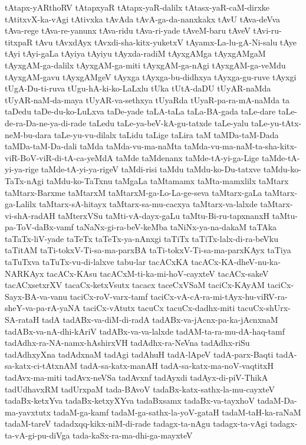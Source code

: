{tAtapx-yARthoRV
tAtapxyaR
tAtapx-yaR-dalilx
tAtasx-yaR-caM-dirxke
tAtitxvX-ka-vAgi
tAtivxka
tAvAda
tAvA-ga-da-nanxkakx
tAvU
tAva-deVva
tAva-rege
tAva-re-yanunx
tAva-ridu
tAva-ri-yade
tAveM-baru
tAveV
tAvi-ru-titxpaR
tAvu
tAvxdAyx
tAvxdi-sha-kitx-yuketxV
tAyamx-La-lu-gA-Ni-salu
tAye
tAyi
tAyi-gaLa
tAyiya
tAyiyu
tAyxda-radiM
tAyxgAMga
tAyxgAMgaM
tAyxgAM-ga-dalilx
tAyxgAM-ga-miti
tAyxgAM-ga-nAgi
tAyxgAM-ga-veMdu
tAyxgAM-gavu
tAyxgAMgeV
tAyxga
tAyxga-bu-didhxya
tAyxga-gu-ruve
tAyxgi
tUgA-Du-ti-ruva
tUgu-hA-ki-ko-LaLxlu
tUka
tUtA-daDU
tUyAR-naMda
tUyAR-naM-da-maya
tUyAR-va-sethxya
tUyaRda
tUyaR-pa-ra-mA-naMda
ta
taDedu
taDe-du-ko-LuLxva
taDe-yade
taLA-taLa
taLa-BA-gada
taLe-dare
taLe-de-ra-Da-ne-ya-di-rade
taLedu
taLe-ya-beV-kA-gu-tatxde
taLe-yalu
taLe-yu-tAtx-neM-bu-dara
taLe-yu-vu-dilalx
taLidu
taLige
taLira
taM
taMDa-taM-Dada
taMDa-taM-Da-dali
taMda
taMda-vu-ma-naMta
taMda-vu-ma-naM-ta-sha-kitx-viR-BoV-viR-di-tA-ca-yeMdA
taMde
taMdenanx
taMde-tA-yi-ga-Lige
taMde-tA-yi-ya-rige
taMde-tA-yi-ya-rigeV
taMdi-risi
taMdu
taMdu-ko-Du-tatxve
taMdu-ko-TaTx-nAgi
taMdu-ko-TaTxnu
taMgaLa
taMtamamx
taMta-mamxlilx
taMtarx
taMtarx-Barxme
taMtarxM
taMtarxM-ga-Lo-La-ge-seva
taMtarx-gaLa
taMtarx-ga-Lalilx
taMtarx-sA-hitayx
taMtarx-sa-mu-cacxya
taMtarx-va-lalxde
taMtarx-vi-shA-radAH
taMterxVSu
taMti-vA-dayx-gaLu
taMtu-Bi-ru-tapxnanxH
taMtu-pa-ToV-daBx-vamf
taNaNx-gi-ra-beV-keMba
taNiNx-ya-na-dakaM
taTAka
taTaTx-liV-yade
taTeTx
taTeTx-ya-nAnxgi
taTiTx
taTiTx-lalx-di-ra-beVku
taTitAM
taTi-tokxV-Ti-sa-ma-parxBA
taTi-tokxV-Ti-sa-ma-parxKAyx
taTiya
taTuTxva
taTuTx-vu-di-lalxve
tabu-lar
tacACxKA
tacACx-KA-dheV-nu-ka-NARKAyx
tacACx-KAsu
tacACxM-ti-ka-mi-hoV-cayxteV
tacACx-sakeV
tacACxsetxrXV
tacaCx-ketxVsutx
tacacx
taceCxVSaM
taciCx-KAyAM
taciCx-Sayx-BA-va-vanu
taciCx-roV-varx-tamf
taciCx-vA-cA-ra-mi-tAyx-hu-viRV-ra-sheY-va-pa-rA-yaNA
taciCx-vAtutx
tacuCx
tacuCx-dadhx-miti
tacuCx-shUrx-SA-rataH
tadA
tadABx-va-diM-di-radA
tadABx-va-jAcnx-pa-ka-jAcnxnaM
tadABx-va-nA-dhi-kAriV
tadABx-va-va-lalxde
tadAM-ta-ra-mu-dA-haq-tamf
tadAdhx-ra-NA-namx-hAshirxVH
tadAdhx-ra-NeVna
tadAdhx-riSu
tadAdhxyXna
tadAdxnaM
tadAgi
tadAhuH
tadA-lApeV
tadA-parx-Baqti
tadA-sa-katx-ci-tAtxnAM
tadA-sa-katx-manAH
tadA-sa-katx-ma-noV-vaqtitxH
tadAvx-ma-miti
tadAvx-neVSa
tadAvxnf
tadAyxdi
tadAyx-di-piV-ThikA
tadUdhavxRM
tadUrxpaM
tada-BAvoV
tadaBx-katx-sathx-la-mu-cayxteV
tadaBx-ketxYva
tadaBx-ketxyXYva
tadaBxsamx
tadaBx-va-tayxhoV
tadaM-Da-ma-yavxtutx
tadaM-ga-kamf
tadaM-ga-sathx-la-yoV-gataH
tadaM-taH-ka-raNaM
tadaM-tareV
tadadxqq-kikx-niM-di-rade
tadagx-ta-nAgu
tadagx-ta-vAgi
tadagx-ta-vA-gi-pu-diVga
tada-kaSx-ra-ma-dhi-ga-mayxteV
}
